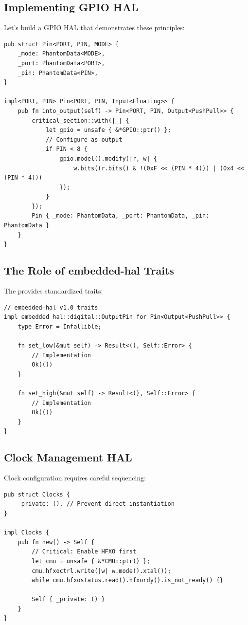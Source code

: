 \subsection{Implementing GPIO HAL}
\label{subsec:gpio-hal}

Let's build a GPIO HAL that demonstrates these principles:

\begin{verbatim}
pub struct Pin<PORT, PIN, MODE> {
    _mode: PhantomData<MODE>,
    _port: PhantomData<PORT>,
    _pin: PhantomData<PIN>,
}

impl<PORT, PIN> Pin<PORT, PIN, Input<Floating>> {
    pub fn into_output(self) -> Pin<PORT, PIN, Output<PushPull>> {
        critical_section::with(|_| {
            let gpio = unsafe { &*GPIO::ptr() };
            // Configure as output
            if PIN < 8 {
                gpio.model().modify(|r, w| {
                    w.bits((r.bits() & !(0xF << (PIN * 4))) | (0x4 << (PIN * 4)))
                });
            }
        });
        Pin { _mode: PhantomData, _port: PhantomData, _pin: PhantomData }
    }
}
\end{verbatim}

\subsection{The Role of embedded-hal Traits}
\label{subsec:embedded-hal-traits}

The  provides standardized traits:

\begin{verbatim}
// embedded-hal v1.0 traits
impl embedded_hal::digital::OutputPin for Pin<Output<PushPull>> {
    type Error = Infallible;
    
    fn set_low(&mut self) -> Result<(), Self::Error> {
        // Implementation
        Ok(())
    }
    
    fn set_high(&mut self) -> Result<(), Self::Error> {
        // Implementation
        Ok(())
    }
}
\end{verbatim}

\subsection{Clock Management HAL}
\label{subsec:clocks-hal}

Clock configuration requires careful sequencing:

\begin{verbatim}
pub struct Clocks {
    _private: (), // Prevent direct instantiation
}

impl Clocks {
    pub fn new() -> Self {
        // Critical: Enable HFXO first
        let cmu = unsafe { &*CMU::ptr() };
        cmu.hfxoctrl.write(|w| w.mode().xtal());
        while cmu.hfxostatus.read().hfxordy().is_not_ready() {}
        
        Self { _private: () }
    }
}
\end{verbatim}

